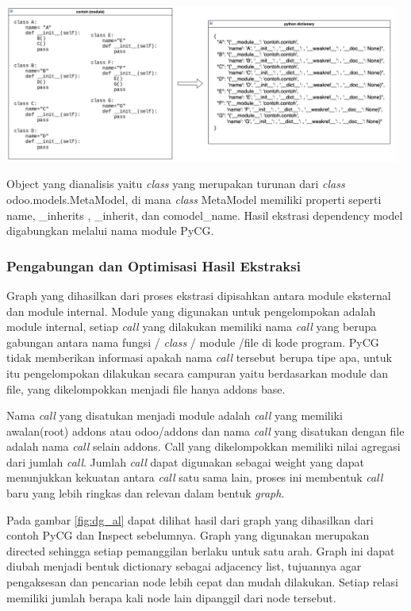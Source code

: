 \begin{center}
	\includegraphics[width=13cm]{img/bab_3/inspectSample.png}
	\label{contoh_inspectSample}
\end{center}

Object yang dianalisis yaitu \textit{class} yang merupakan turunan dari \textit{class} odoo.models.MetaModel, di mana \textit{class} MetaModel memiliki properti seperti  name, \_inherits , \_inherit, dan comodel\_name. Hasil ekstrasi dependency model digabungkan melalui nama module PyCG.

\subsubsection{Pengabungan dan Optimisasi Hasil Ekstraksi}
Graph yang dihasilkan dari proses ekstrasi dipisahkan antara module eksternal dan module internal. Module yang digunakan untuk pengelompokan adalah module internal, setiap \textit{call} yang dilakukan memiliki nama \textit{call} yang berupa gabungan antara nama fungsi / \textit{class} / module /file di kode program. PyCG tidak memberikan informasi apakah nama \textit{call} tersebut berupa tipe apa, untuk itu pengelompokan dilakukan secara campuran yaitu berdasarkan module dan file, yang dikelompokkan menjadi file hanya addons base.

Nama \textit{call} yang disatukan menjadi module adalah \textit{call} yang memiliki awalan(root) addons atau odoo/addons dan nama \textit{call} yang disatukan dengan file adalah nama \textit{call} selain addons. Call yang dikelompokkan memiliki nilai agregasi dari jumlah \textit{call}. Jumlah \textit{call} dapat digunakan sebagai weight yang dapat menunjukkan kekuatan antara \textit{call} satu sama lain, proses ini membentuk \textit{call} baru yang lebih ringkas dan relevan dalam bentuk \textit{graph}. 

Pada gambar \ref{fig:dg_al} dapat dilihat hasil dari graph yang dihasilkan dari contoh PyCG dan Inspect sebelumnya. Graph yang digunakan merupakan directed sehingga setiap pemanggilan berlaku untuk satu arah. Graph ini dapat diubah menjadi bentuk dictionary sebagai adjacency list, tujuannya agar pengaksesan dan pencarian node lebih cepat dan mudah dilakukan. Setiap relasi memiliki jumlah berapa kali node lain dipanggil dari node tersebut.

